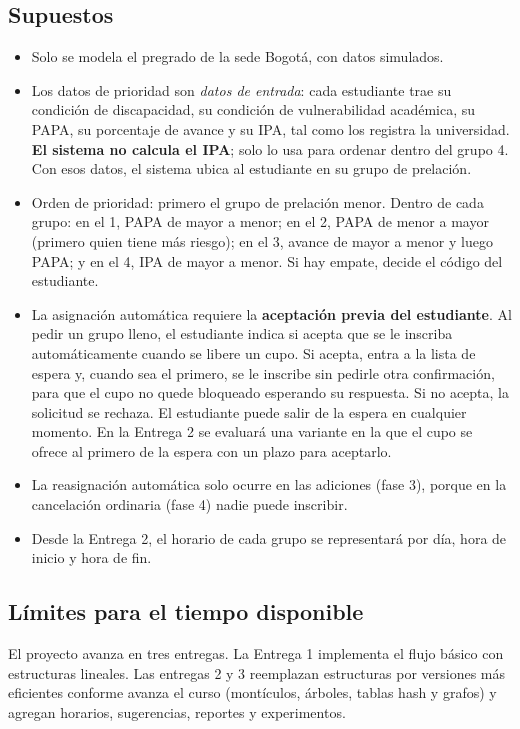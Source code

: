 \documentclass[conference]{IEEEtran}
\begin{document}
\subsection{Supuestos}
\begin{itemize}
    \item Solo se modela el pregrado de la sede Bogotá, con datos simulados.
    \item Los datos de prioridad son \emph{datos de entrada}: cada estudiante trae su condición de discapacidad, su condición de vulnerabilidad académica, su PAPA, su porcentaje de avance y su IPA, tal como los registra la universidad. \textbf{El sistema no calcula el IPA}; solo lo usa para ordenar dentro del grupo 4. Con esos datos, el sistema ubica al estudiante en su grupo de prelación.
    \item Orden de prioridad: primero el grupo de prelación menor. Dentro de cada grupo: en el 1, PAPA de mayor a menor; en el 2, PAPA de menor a mayor (primero quien tiene más riesgo); en el 3, avance de mayor a menor y luego PAPA; y en el 4, IPA de mayor a menor. Si hay empate, decide el código del estudiante.
    \item La asignación automática requiere la \textbf{aceptación previa del estudiante}. Al pedir un grupo lleno, el estudiante indica si acepta que se le inscriba automáticamente cuando se libere un cupo. Si acepta, entra a la lista de espera y, cuando sea el primero, se le inscribe sin pedirle otra confirmación, para que el cupo no quede bloqueado esperando su respuesta. Si no acepta, la solicitud se rechaza. El estudiante puede salir de la espera en cualquier momento. En la Entrega 2 se evaluará una variante en la que el cupo se ofrece al primero de la espera con un plazo para aceptarlo.
    \item La reasignación automática solo ocurre en las adiciones (fase 3), porque en la cancelación ordinaria (fase 4) nadie puede inscribir.
    \item Desde la Entrega 2, el horario de cada grupo se representará por día, hora de inicio y hora de fin.
\end{itemize}

\subsection{Límites para el tiempo disponible}
El proyecto avanza en tres entregas. La Entrega 1 implementa el flujo básico con estructuras lineales. Las entregas 2 y 3 reemplazan estructuras por versiones más eficientes conforme avanza el curso (montículos, árboles, tablas hash y grafos) y agregan horarios, sugerencias, reportes y experimentos.
\end{document}

